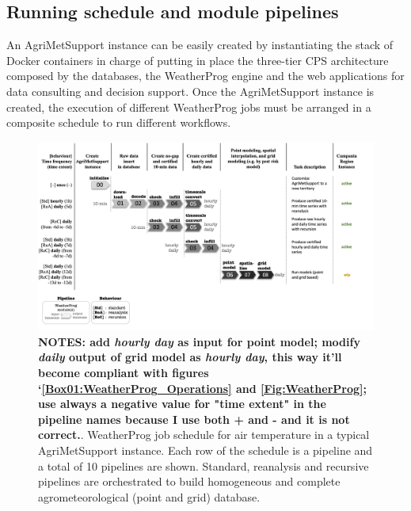 \documentclass[authoryear,preprint,review,12pt]{elsarticle}
\newcommand{\statusblock}[3]{
    \ifthenelse{\equal{#2}{todo}}
        {\textcolor{red}{#1 (TO DO): #3}}
        {}
    \ifthenelse{\equal{#2}{wip}}
        {\textcolor{magenta}{#1 (IN PROGRESS): #3}}
        {}
    \ifthenelse{\equal{#2}{update}}
        {\textcolor{blue}{#1 (UPDATE): #3}}
        {}
    \ifthenelse{\equal{#2}{review}}
        {\textcolor{cyan}{#1 (REVIEW): #3}}
        {}
    \ifthenelse{\equal{#2}{done}}
        {\textcolor{PineGreen}{#1 (READY): #3}}
        {}
}
\begin{document}
\subsection{ Running schedule and module pipelines }

An Agri\-Met\-Support instance can be easily created by instantiating the stack of Docker containers in charge of putting in place the three-tier CPS architecture composed by the databases, the WeatherProg engine and the web applications for data consulting and decision support.
Once the Agri\-Met\-Support instance is created, the execution of different WeatherProg jobs must be arranged in a composite schedule to run %
different workflows.
\begin{figure}
	\centering %
	\includegraphics[scale=.6, angle=90, trim=0 2cm 7cm 2cm]{figures/WeatherProg-schedule-fig-v2.png}
	\caption{ \textbf{NOTES: add \textit{hourly day} as input for point model; modify \textit{daily} output of grid model as \textit{hourly day}, this way it'll become compliant with figures `\cref{Box01:WeatherProg_Operations} and \cref{Fig:WeatherProg}; use always a negative value for "time extent" in the pipeline names because I use both + and - and it is not correct.}.
    WeatherProg job schedule for air temperature in a typical Agri\-Met\-Support instance.
    Each row of the schedule is a pipeline and a total of 10 pipelines are shown.
    Standard, reanalysis and recursive pipelines are orchestrated to build homogeneous and complete agrometeorological (point and grid) database.}
	\label{Fig:weatherprog:calls}
\end{figure}
\end{document}
